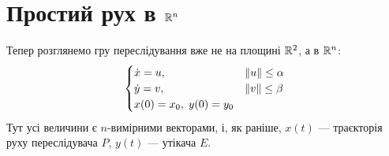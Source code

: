\section{Простий рух в \texorpdfstring{$\mathbb{R}^n$}{Rn}}\label{sec_3_2}
Тепер розглянемо гру переслідування вже не на площині $\mathbb{R}^2$, а в $\mathbb{R}^n$:
\begin{gather}
    \begin{cases}
        \dot{x} = u, & \Vert u \Vert \leq \alpha \\
        \dot{y} = v, & \Vert v \Vert \leq \beta \\
        x(0) = x_0, \; y(0) = y_0
    \end{cases}
\end{gather}
Тут усі величини є $n$-вимірними векторами, і, як раніше, $x(t)$ --- траєкторія
руху переслідувача $P$, $y(t)$ --- утікача $E$.

